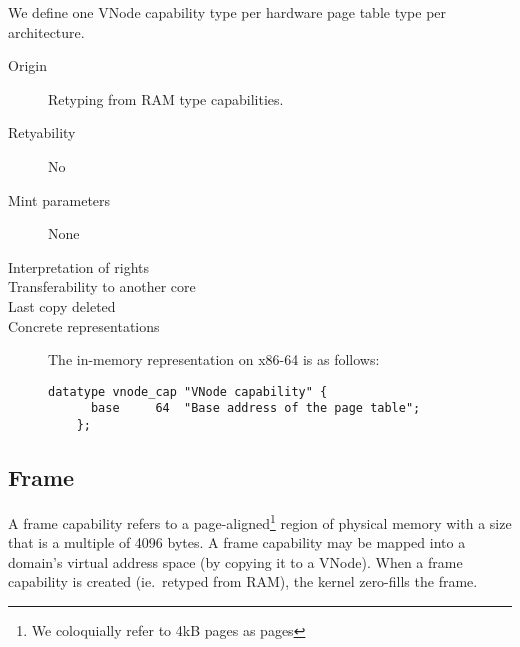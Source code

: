 We define one VNode capability type per hardware page table type per
architecture.

\begin{description}
\item[Origin] Retyping from RAM type capabilities.

\item[Retyability] No

\item[Mint parameters] None
  
\item[Interpretation of rights] 
  
\item[Transferability to another core] 

\item[Last copy deleted] 
  
\item[Concrete representations] The in-memory representation on x86-64
  is as follows:
  
  \begin{lstlisting}[language=Mackerel]
    datatype vnode_cap "VNode capability" {
      base     64  "Base address of the page table";
    };
  \end{lstlisting}
\end{description}  

\subsection{Frame}
A frame capability refers to a page-aligned\footnote{We coloquially refer to
4kB pages as pages} region of physical memory with a size that is a multiple
of 4096 bytes.
A frame capability may be mapped into a domain's virtual address space (by
copying it to a VNode).
When a frame capability is created (ie.~retyped from RAM), the kernel
zero-fills the frame.

